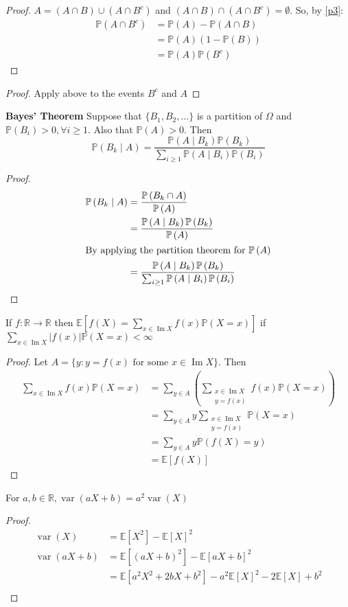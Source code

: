 \documentclass[fontsize=10pt]{article}
\numberwithin{equation}{subsection}
\newcommand{\PP}[1]{\mathbb{P}\left(#1\right)}
\newcommand{\EE}[1]{\mathbb{E}\left[#1\right]}
\newcommand{\image}{\mathop{\mathrm{Im}}}
\newcommand{\setreal}{\mathbb{R}}
\newcommand{\var}{\mathop{\mathrm{var}}}
\begin{document}
\begin{itemize*}
\begin{multicols}{2}
\begin{proof}
$A=(A\cap B)\cup(A\cap B^c)$ and $(A\cap B)\cap(A\cap B^c)=\emptyset$.  So, by \eqref{p3}:
\begin{align*}
\PP{A\cap B^c}&=\PP{A}-\PP{A\cap B}\\
&=\PP A\left(1-\PP B\right)\\
&=\PP A \PP{B^c}
\end{align*}
\end{proof}
\begin{proof}
Apply above to the events $B^c$ and $A$
\end{proof}
\item{\bf Bayes' Theorem}  Suppose that $\{B_1,B_2,\ldots\}$ is a partition of $\Omega$ and $\PP{B_i}>0, \forall i\ge1$.  Also that $\PP A>0$.  Then
\[\PP{B_k\mid A}=\frac{\PP{A\mid B_k}\PP{B_k}}{\sum_{i\ge1}\PP{A\mid B_i}\PP{B_i}}\]
\begin{proof}
\begin{align*}
\PP{B_k\mid A}&=\frac{\PP{B_k\cap A}}{\PP A}\\
&=\frac{\PP{A\mid B_k}\PP{B_k}}{\PP A}\\
\intertext{By applying the partition theorem for $\PP A$}
&=\frac{\PP{A\mid B_k}\PP{B_k}}{\sum_{i\ge1}\PP{A\mid B_i}\PP{B_i}}
\end{align*}
\end{proof}
\item If $f:\setreal\to\setreal$ then $\EE{f\left(X\right)=\sum_{x\in\image X}f(x)\PP{X=x}}$ if $\sum_{x\in\image X}\left|f(x)\right|\PP{X=x}<\infty$
\begin{proof}
Let $A=\{y:y=f(x)\text{ for some }x\in\image X\}$.  Then 
\begin{align*}
\sum_{x\in\image X}f(x)\PP{X=x}&=\sum_{y\in A}\left(\sum_{\substack{x\in\image X\\y=f(x)}}f(x)\PP{X=x}\right)\\
&=\sum_{y\in A}y\sum_{\substack{x\in\image X\\y=f(x)}}\PP{X=x}\\
&=\sum_{y\in A}y\PP{f(X)=y}\\
&=\EE{f(X)}
\end{align*}
\end{proof}
\item For $a,b\in\setreal,\var(aX+b)=a^2\var(X)$
\begin{proof}
\begin{align*}
\var(X)&=\EE{X^2}-\EE X^2\\
\var(aX+b)&=\EE{\left(aX+b\right)^2}-\EE{aX+b}^2\\
&=\EE{a^2X^2+2bX+b^2}-a^2\EE X^2-2\EE X+b^2\\

\end{align*}
\end{proof}
\end{multicols}
\end{itemize*}
\end{document}
